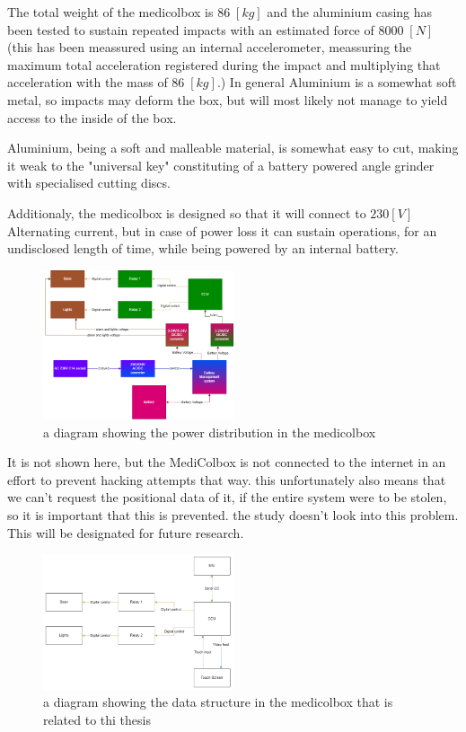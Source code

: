 \documentclass[../main.tex]{subfiles}
\begin{document}
The total weight of the \gls{medicolbox} is $86\;[kg]$ and the aluminium casing has been tested to sustain repeated impacts with an
estimated force of $8 000\;[N]$ (this has been meassured using an internal accelerometer,
meassuring the maximum total acceleration registered during the impact and multiplying that acceleration with the mass of $86\;[kg]$.)
In general Aluminium is a somewhat soft metal, so impacts may deform the box, but will most likely not manage to yield access to the inside of the box.

Aluminium, being a soft and malleable material, is somewhat easy to cut,
making it weak to the "universal key" constituting of
a battery powered angle grinder with specialised cutting discs.

Additionaly, the medicolbox is designed so that it will connect to $230 [V]$ Alternating current, but in case of power loss it can sustain operations, for an undisclosed length of time, while being powered by an internal battery.

\begin{figure}[htbp]
    \centering
    \includegraphics[width=0.5\textwidth]
    {resources/images/MediColBox-power-distribution.png}
    \caption{a diagram showing the power distribution in the \gls{medicolbox}}
    \label{fig:MediColBox-power-distribution}
\end{figure}

It is not shown here, but the MediColbox is not connected to the internet in an effort to prevent hacking attempts that way. this unfortunately also means that we can't request the positional data of it, if the entire system were to be stolen, so it is important that this is prevented. the study doesn't look into this problem. This will be designated for future research.

\begin{figure}[htbp]
    \centering
    \includegraphics[width=0.5\textwidth]
    {resources/images/MediColBox-related-data-diagram.png}
    \caption{a diagram showing the data structure in the \gls{medicolbox} that is related to thi thesis}
    \label{fig:MediColBox-related-data-diagram}
\end{figure}
\end{document}
